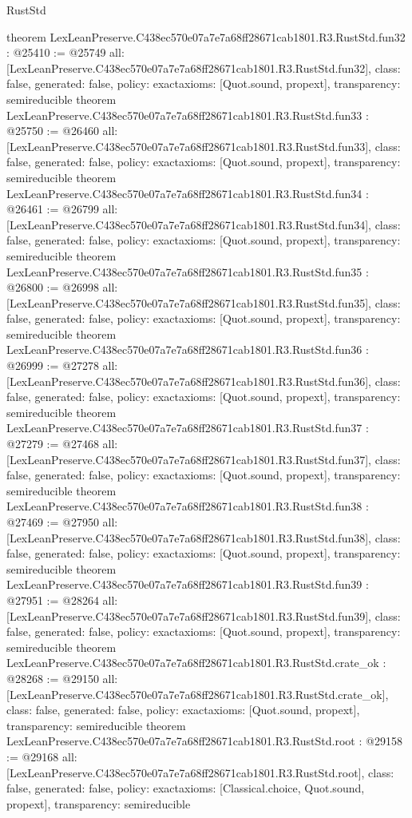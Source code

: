 \begin{lexlean}{RustStd}
\begin{coremodule}
{}
theorem LexLeanPreserve.C438ec570e07a7e7a68ff28671cab1801.R3.RustStd.fun32 : @25410 := @25749 {
  all: [LexLeanPreserve.C438ec570e07a7e7a68ff28671cab1801.R3.RustStd.fun32],
  class: false,
  generated: false,
  policy: exact{axioms: [Quot.sound, propext]},
  transparency: semireducible
}
theorem LexLeanPreserve.C438ec570e07a7e7a68ff28671cab1801.R3.RustStd.fun33 : @25750 := @26460 {
  all: [LexLeanPreserve.C438ec570e07a7e7a68ff28671cab1801.R3.RustStd.fun33],
  class: false,
  generated: false,
  policy: exact{axioms: [Quot.sound, propext]},
  transparency: semireducible
}
theorem LexLeanPreserve.C438ec570e07a7e7a68ff28671cab1801.R3.RustStd.fun34 : @26461 := @26799 {
  all: [LexLeanPreserve.C438ec570e07a7e7a68ff28671cab1801.R3.RustStd.fun34],
  class: false,
  generated: false,
  policy: exact{axioms: [Quot.sound, propext]},
  transparency: semireducible
}
theorem LexLeanPreserve.C438ec570e07a7e7a68ff28671cab1801.R3.RustStd.fun35 : @26800 := @26998 {
  all: [LexLeanPreserve.C438ec570e07a7e7a68ff28671cab1801.R3.RustStd.fun35],
  class: false,
  generated: false,
  policy: exact{axioms: [Quot.sound, propext]},
  transparency: semireducible
}
theorem LexLeanPreserve.C438ec570e07a7e7a68ff28671cab1801.R3.RustStd.fun36 : @26999 := @27278 {
  all: [LexLeanPreserve.C438ec570e07a7e7a68ff28671cab1801.R3.RustStd.fun36],
  class: false,
  generated: false,
  policy: exact{axioms: [Quot.sound, propext]},
  transparency: semireducible
}
theorem LexLeanPreserve.C438ec570e07a7e7a68ff28671cab1801.R3.RustStd.fun37 : @27279 := @27468 {
  all: [LexLeanPreserve.C438ec570e07a7e7a68ff28671cab1801.R3.RustStd.fun37],
  class: false,
  generated: false,
  policy: exact{axioms: [Quot.sound, propext]},
  transparency: semireducible
}
theorem LexLeanPreserve.C438ec570e07a7e7a68ff28671cab1801.R3.RustStd.fun38 : @27469 := @27950 {
  all: [LexLeanPreserve.C438ec570e07a7e7a68ff28671cab1801.R3.RustStd.fun38],
  class: false,
  generated: false,
  policy: exact{axioms: [Quot.sound, propext]},
  transparency: semireducible
}
theorem LexLeanPreserve.C438ec570e07a7e7a68ff28671cab1801.R3.RustStd.fun39 : @27951 := @28264 {
  all: [LexLeanPreserve.C438ec570e07a7e7a68ff28671cab1801.R3.RustStd.fun39],
  class: false,
  generated: false,
  policy: exact{axioms: [Quot.sound, propext]},
  transparency: semireducible
}
theorem LexLeanPreserve.C438ec570e07a7e7a68ff28671cab1801.R3.RustStd.crate_ok : @28268 := @29150 {
  all: [LexLeanPreserve.C438ec570e07a7e7a68ff28671cab1801.R3.RustStd.crate_ok],
  class: false,
  generated: false,
  policy: exact{axioms: [Quot.sound, propext]},
  transparency: semireducible
}
theorem LexLeanPreserve.C438ec570e07a7e7a68ff28671cab1801.R3.RustStd.root : @29158 := @29168 {
  all: [LexLeanPreserve.C438ec570e07a7e7a68ff28671cab1801.R3.RustStd.root],
  class: false,
  generated: false,
  policy: exact{axioms: [Classical.choice, Quot.sound, propext]},
  transparency: semireducible
}


\end{coremodule}
\end{lexlean}
